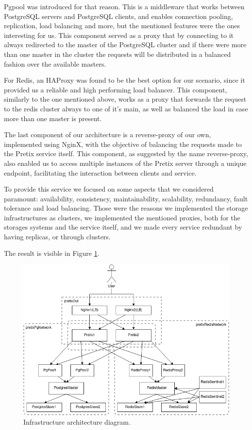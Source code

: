 \documentclass[12pt]{article}
\begin{document}
Pgpool \cite{pgpool} was introduced for that reason. This is a middleware that works between PostgreSQL servers and PostgreSQL clients, and enables connection pooling, replication, load balancing and more, but the mentioned features were the ones interesting for us.
This component served as a proxy that by connecting to it always redirected to the master of the PostgreSQL cluster and if there were more than one master in the cluster the requests will be distributed in a balanced fashion over the available masters. 

For Redis, an HAProxy \cite{haproxy} was found to be the best option for our scenario, since it provided us a reliable and high performing load balancer. This component, similarly to the one mentioned above, works as a proxy that forwards the request to the redis cluster always to one of it's main, as well as balanced the load in case more than one master is present.

The last component of our architecture is a reverse-proxy of our own, implemented using NginX, with the objective of balancing the requests made to the Pretix service itself. This component, as suggested by the name reverse-proxy, also enabled us to access multiple instances of the Pretix server through a unique endpoint, facilitating the interaction between clients and service.

To provide this service we focused on some aspects that we considered paramount: availability, consistency, maintainability, scalability, redundancy, fault tolerance and load balancing. Those were the reasons we implemented the storage infrastructures as clusters, we implemented the mentioned proxies, both for the storages systems and the service itself, and we made every service redundant by having replicas, or through clusters.

The result is visible in Figure \ref{fig:InfrastructureArchitecture}.

\begin{figure}[!h]
  \centering
  \begin{minipage}{.85\textwidth}
    \centering
    \includegraphics[width=\linewidth]{diagrams/InfrastructureArchitecture.png}
  \end{minipage}%
  \caption{Infrastructure architecture diagram.}
  \label{fig:InfrastructureArchitecture}
\end{figure} 
\end{document}
